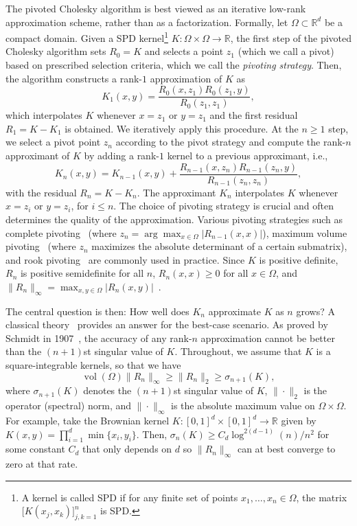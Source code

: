 \documentclass{amsart}
\theoremstyle{definition}
\theoremstyle{remark}
\begin{document}
The pivoted Cholesky algorithm is best viewed as an iterative low-rank approximation scheme, rather than as a factorization. Formally, let $\Omega\subset\mathbb{R}^d$ be a compact domain. Given a SPD kernel\footnote{A kernel is called SPD if for any finite set of points $x_1,\ldots,x_n \in \Omega$, the matrix $\big[K(x_j,x_k)\big]_{j,k=1}^n$ is SPD.} $K:\Omega\times \Omega \rightarrow \mathbb{R}$, the first step of the pivoted Cholesky algorithm sets $R_0 = K$ and selects a point $z_1$ (which we call a pivot) based on prescribed selection criteria, which we call the \textit{pivoting strategy}. Then, the algorithm constructs a rank-$1$ approximation of $K$ as
\begin{equation*}
K_1(x,y) = \frac{R_0(x,z_1)R_0(z_1,y)}{R_0(z_1,z_1)},
\end{equation*}
which interpolates $K$ whenever $x = z_1$ or $y = z_1$ and the first residual $R_1=K - K_1$ is obtained. We iteratively apply this procedure. At the $n\geq 1$ step, we select a pivot point $z_n$ according to the pivot strategy and compute the rank-$n$ approximant of $K$ by adding a rank-$1$ kernel to a previous approximant, i.e., 
\begin{equation}
    K_n(x, y) = K_{n-1}(x, y) + \frac{R_{n-1}(x, z_n)R_{n-1}(z_n, y)}{R_{n-1}(z_n, z_n)},
    \label{eq:CholeskyAlgorithm}
\end{equation}
with the residual $R_n=K - K_n$. The approximant $K_n$ interpolates $K$ whenever $x = z_i$ or $y = z_i$, for $i\leq n$. The choice of pivoting strategy is crucial and often determines the quality of the approximation. Various pivoting strategies such as complete pivoting~\cite{golub2013matrix} (where $z_n = \arg\max_{x\in\Omega} |R_{n-1}(x,x)|$), maximum volume pivoting~\cite{gu1996efficient,hong1992rank} (where $z_n$ maximizes the absolute determinant of a certain submatrix), and rook pivoting~\cite{neal1992geometric} are commonly used in practice. Since $K$ is positive definite, $R_n$ is positive semidefinite for all $n$, $R_n(x,x)\geq 0$ for all $x\in\Omega$, and $\|R_n\|_\infty = \max_{x,y\in\Omega} |R_n(x,y)|$~\cite{townsend2015continuous}.



The central question is then: How well does $K_n$ approximate $K$ as $n$ grows? A classical theory~\cite{schmidt1907theorie} provides an answer for the best-case scenario. As proved by Schmidt in 1907~\cite{schmidt1907theorie}, the accuracy of any rank-$n$ approximation cannot be better than the $(n+1)$st singular value of $K$. Throughout, we assume that $K$ is a square-integrable kernels, so that we have
\begin{equation*}
     \operatorname{vol}(\Omega) \|R_n\|_{\infty} \geq \|R_n\|_2 \geq \sigma_{n+1}(K),
\end{equation*}
where $\sigma_{n+1}(K)$ denotes the $(n+1)$st singular value of $K$, $\|\cdot\|_2$ is the operator (spectral) norm, and $\|\cdot\|_{\infty}$ is the absolute maximum value on $\Omega\times \Omega$. For example, take the Brownian kernel $K : [0,1]^d\times [0,1]^d\rightarrow \mathbb{R}$ given by $K(x,y) = \prod_{i=1}^d\min\{x_i,y_i\}$. Then, $\sigma_{n}(K) \geq C_d \log^{2(d-1)}(n)/n^2$ for some constant $C_d$ that only depends on $d$ so $\|R_n\|_\infty$ can at best converge to zero at that rate. 
\end{document}
